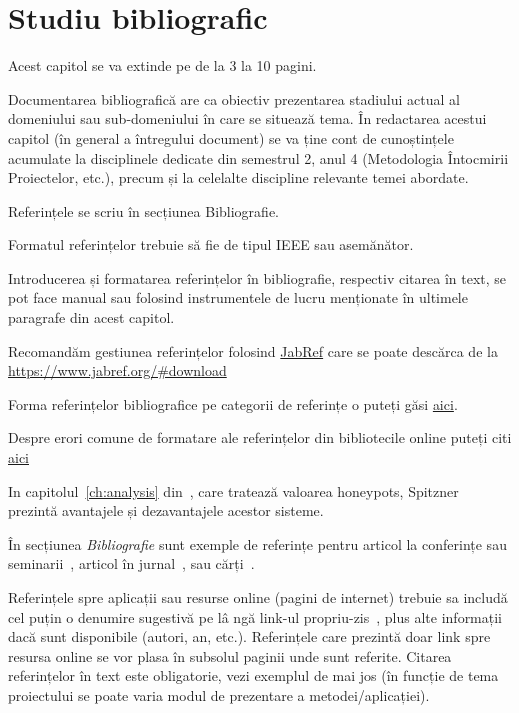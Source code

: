 \chapter{Studiu bibliografic}\label{ch:studiubib}

\pagestyle{fancy}


{\color{blue}\noindent Acest capitol se va extinde pe de la 3 la 10 pagini.\\}

Documentarea bibliografică are ca obiectiv prezentarea stadiului actual al domeniului sau sub-domeniului în care se situează tema.
În redactarea acestui capitol (în general a întregului document) se va ține cont de cunoștințele acumulate la disciplinele dedicate din semestrul 2, anul 4
(Metodologia Întocmirii Proiectelor, etc.), precum și la celelalte discipline relevante temei abordate.


Referințele se scriu în secțiunea Bibliografie.

Formatul referințelor trebuie să fie de tipul IEEE sau asemănător.

Introducerea și formatarea referințelor în bibliografie, respectiv citarea în text, se pot face manual sau folosind instrumentele de lucru menționate în ultimele paragrafe din acest capitol.

Recomandăm gestiunea referințelor folosind \href{https://www.jabref.org/}{JabRef} care se poate descărca de la \url{https://www.jabref.org/#download}

Forma referințelor bibliografice pe categorii de referințe o puteți găsi \href{https://libguides.nps.edu/citation/ieee-bibtex}{aici}.

Despre erori comune de formatare ale referințelor din bibliotecile online puteți citi \href{https://www.ece.ucdavis.edu/~jowens/biberrors.html}{aici}


In capitolul~\ref{ch:analysis} din~\cite{strunk}, care tratează valoarea honeypots, Spitzner prezintă avantajele și dezavantajele acestor sisteme.


În secțiunea \textit{Bibliografie} sunt exemple de referințe pentru articol la conferințe sau seminarii~\cite{BellucciLZ04}, articol în jurnal~\cite{AntoniouSBDB07},
sau cărți~\cite{russell1995artificial}.


Referințele spre aplicații sau resurse online (pagini de internet) trebuie sa includă cel puțin o denumire sugestivă pe lâ ngă link-ul propriu-zis~\cite{webpage},
plus alte informații dacă sunt disponibile (autori, an, etc.).
Referințele care prezintă doar link spre resursa online se vor plasa în subsolul paginii unde sunt referite.
Citarea referințelor în text este obligatorie, vezi exemplul de mai jos (în funcție de tema proiectului se poate varia modul de prezentare a metodei/aplicației).

